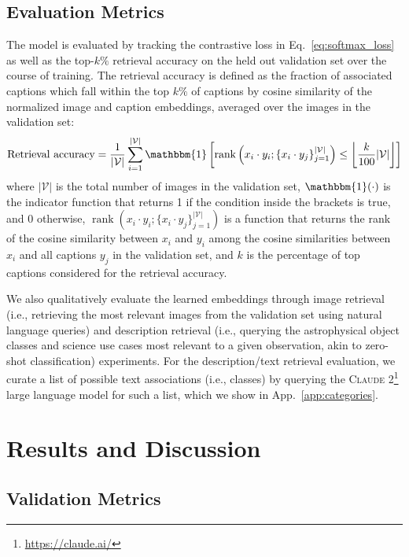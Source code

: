 \documentclass[10pt]{article} %
\begin{document}
\subsection{Evaluation Metrics}
\label{sec:eval}

The model is evaluated by tracking the contrastive loss in Eq.~\ref{eq:softmax_loss} as well as the top-$k\%$ retrieval accuracy on the held out validation set over the course of training.
%
The retrieval accuracy is defined as the fraction of associated captions which fall within the top $k\%$ of captions by cosine similarity of the normalized image and caption embeddings, averaged over the images in the validation set:
\begin{equation}
\text{Retrieval accuracy} = \frac{1}{|\mathcal V|} \sum_{i=1}^{|\mathcal V|} \mathbbm{1}\left[\operatorname{rank}\left({x}_i \cdot {y}_{i}; \{{x}_i \cdot {y}_{j}\}_{j=1}^{|\mathcal V|}\right) \leq \left\lfloor\frac{k}{100}|\mathcal V|\right\rfloor\right]
\label{eq:retrieval_accuracy}
\end{equation}
where $|\mathcal V|$ is the total number of images in the validation set, $\mathbbm{1}(\cdot)$ is the indicator function that returns 1 if the condition inside the brackets is true, and 0 otherwise, $\operatorname{rank}\left({x}_i \cdot {y}_{i}; \{{x}_i \cdot {y}_{j}\}_{j=1}^{|\mathcal V|}\right)$ is a function that returns the rank of the cosine similarity between ${x}_i$ and ${y}_{i}$ among the cosine similarities between ${x}_i$ and all captions ${y}_j$ in the validation set, and $k$ is the percentage of top captions considered for the retrieval accuracy.

We also qualitatively evaluate the learned embeddings through image retrieval (i.e., retrieving the most relevant images from the validation set using natural language queries) and description retrieval (i.e., querying the astrophysical object classes and science use cases most relevant to a given observation, akin to zero-shot classification) experiments. 
%
For the description/text retrieval evaluation, we curate a list of possible text associations (i.e., classes) by querying the \textsc{Claude 2}\footnote{\url{https://claude.ai/}} large language model for such a list, which we show in App.~\ref{app:categories}.

\section{Results and Discussion}
\label{sec:results}

\subsection{Validation Metrics}
\end{document}
